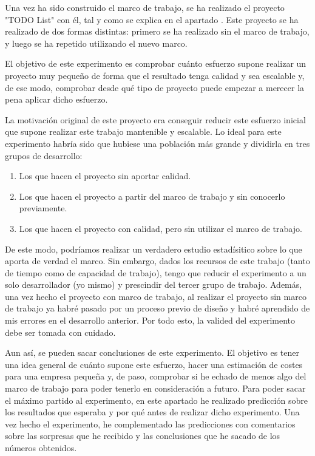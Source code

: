Una vez ha sido construido el marco de trabajo, se ha realizado el proyecto "TODO List" con él, tal y como se explica en el apartado . Este proyecto se ha realizado de dos formas distintas: primero se ha realizado sin el marco de trabajo, y luego se ha repetido utilizando el nuevo marco.

El objetivo de este experimento es comprobar cuánto esfuerzo supone realizar un proyecto muy pequeño de forma que el resultado tenga calidad y sea escalable y, de ese modo, comprobar desde qué tipo de proyecto puede empezar a merecer la pena aplicar dicho esfuerzo.

La motivación original de este proyecto era conseguir reducir este esfuerzo inicial que supone realizar este trabajo mantenible y escalable. Lo ideal para este experimento habría sido que hubiese una población más grande y dividirla en tres grupos de desarrollo:

\begin{enumerate}
\item Los que hacen el proyecto sin aportar calidad.
\item Los que hacen el proyecto a partir del marco de trabajo y sin conocerlo previamente.
\item Los que hacen el proyecto con calidad, pero sin utilizar el marco de trabajo.
\end{enumerate}

De este modo, podríamos realizar un verdadero estudio estadísitico sobre lo que aporta de verdad el marco. Sin embargo, dados los recursos de este trabajo (tanto de tiempo como de capacidad de trabajo), tengo que reducir el experimento a un solo desarrollador (yo mismo) y prescindir del tercer grupo de trabajo. Además, una vez hecho el proyecto con marco de trabajo, al realizar el proyecto sin marco de trabajo ya habré pasado por un proceso previo de diseño y habré aprendido de mis errores en el desarrollo anterior. Por todo esto, la valided del experimento debe ser tomada con cuidado.

Aun así, se pueden sacar conclusiones de este experimento. El objetivo es tener una idea general de cuánto supone este esfuerzo, hacer una estimación de costes para una empresa pequeña y, de paso, comprobar si he echado de menos algo del marco de trabajo para poder tenerlo en consideración a futuro. Para poder sacar el máximo partido al experimento, en este apartado he realizado predicción sobre los resultados que esperaba y por qué antes de realizar dicho experimento. Una vez hecho el experimento, he complementado las predicciones con comentarios sobre las sorpresas que he recibido y las conclusiones que he sacado de los números obtenidos.
